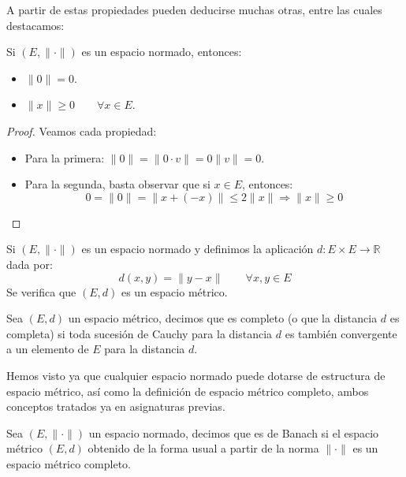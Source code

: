 A partir de estas propiedades pueden deducirse muchas otras, entre las cuales destacamos:
\begin{prop}
    Si $(E, \|\cdot \|)$ es un espacio normado, entonces:
    \begin{itemize}
        \item $\|0\| = 0$.
        \item $\|x\| \geq 0 \qquad \forall x\in E$.
    \end{itemize}
    \begin{proof}
        Veamos cada propiedad:
        \begin{itemize}
            \item Para la primera: $\|0\| = \|0\cdot v\| = 0\|v\| = 0$.
            \item Para la segunda, basta observar que si $x\in E$, entonces:
                \begin{equation*}
                    0 = \|0\| = \|x + (-x)\| \leq 2\|x\| \Longrightarrow \|x\| \geq 0
                \end{equation*}
        \end{itemize}
    \end{proof}
\end{prop}

\begin{prop}
    Si $(E,\|\cdot \|)$ es un espacio normado y definimos la aplicación $d:E\times E\to \mathbb{R}$ dada por:
    \begin{equation*}
        d(x,y) = \|y-x\| \qquad \forall x,y\in E
    \end{equation*}
    Se verifica que $(E, d)$ es un espacio métrico.
\end{prop}

\begin{definicion}
    Sea $(E,d)$ un espacio métrico, decimos que es completo (o que la distancia $d$ es completa) si toda sucesión de Cauchy para la distancia $d$ es también convergente a un elemento de $E$ para la distancia $d$.
\end{definicion}

Hemos visto ya que cualquier espacio normado puede dotarse de estructura de espacio métrico, así como la definición de espacio métrico completo, ambos conceptos tratados ya en asignaturas previas.

\begin{definicion}
    Sea $(E,\|\cdot \|)$ un espacio normado, decimos que es de Banach si el espacio métrico $(E,d)$ obtenido de la forma usual a partir de la norma $\|\cdot \|$ es un espacio métrico completo.
\end{definicion}

